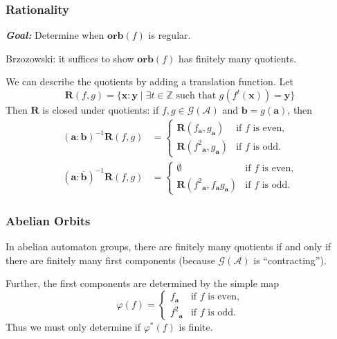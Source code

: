 \documentclass{beamer}
\newcommand{\Z}{\mathbb{Z}}
\newcommand{\ch}[1]{\mathbf{#1}}
\newcommand{\A}{\mathcal{A}}
\newcommand{\gp}{\mathcal{G}}
\newcommand{\res}[2]{{{#1}_{\ch{#2}}}}
\newcommand{\orb}{\mathbf{orb}}
\newcommand{\R}{\mathbf{R}}
\newcommand{\f}[1]{\overline{#1}}
\begin{document}
\begin{frame}
    \frametitle{Rationality}
    {\bf \emph{Goal:}} Determine when $\orb(f)$ is regular.
    \pause

    Brzozowski: it suffices to show $\orb(f)$ has finitely many quotients.
    \pause

    We can describe the quotients by adding a translation function.  Let
    \[
        \R(f, g) = \{\ch{x}:\ch{y} \mid \exists t \in \Z
        \text{ such that } g(f^t(\ch{x})) = \ch{y}\}
    \]
    Then $\R$ is closed under quotients: if $f, g \in \gp(\A)$ and $\ch{b} =
    g(\ch{a})$, then
    \begin{align*}
        (\ch{a} {:} \ch{b})^{-1} \R(f, g) &=
        \begin{cases}
            \R(\res{f}{a}, \res{g}{a}) & \text{if $f$ is even,}\\
            \R(\res{f^2}{a}, \res{g}{a}) & \text{if $f$ is odd.}
        \end{cases}\\
        (\ch{a} {:} \f{\ch{b}})^{-1} \R(f, g) &=
        \begin{cases}
            \emptyset & \text{if $f$ is even,}\\
            \R(\res{f^2}{a}, \res{f}{a}\res{g}{\f{a}}) &
            \text{if $f$ is odd.}
        \end{cases}
    \end{align*}
\end{frame}

\begin{frame}
    \frametitle{Abelian Orbits}
    In abelian automaton groups, there are finitely many quotients if and only
    if there are finitely many first components (because $\gp(\A)$ is
    ``contracting'').
    \pause

    \vspace{.5cm}
    Further, the first components are determined by the simple map
    \[
        \varphi(f) = \begin{cases}
            \res{f}{a} & \text{if $f$ is even,}\\
            \res{f^2}{a} & \text{if $f$ is odd.}
        \end{cases}
    \]
    \vspace{.5cm}
    Thus we must only determine if $\varphi^*(f)$ is finite.
\end{frame}
\end{document}
